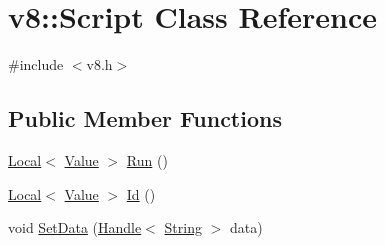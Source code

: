 \hypertarget{classv8_1_1_script}{}\section{v8\+:\+:Script Class Reference}
\label{classv8_1_1_script}


{\ttfamily \#include $<$v8.\+h$>$}

\subsection*{Public Member Functions}
\begin{DoxyCompactItemize}
\item 
\hyperlink{classv8_1_1_local}{Local}$<$ \hyperlink{classv8_1_1_value}{Value} $>$ \hyperlink{classv8_1_1_script_a5f43b29d40bd51ebad2cc275ba3898a1}{Run} ()
\item 
\hyperlink{classv8_1_1_local}{Local}$<$ \hyperlink{classv8_1_1_value}{Value} $>$ \hyperlink{classv8_1_1_script_aa25adfbb98af9179b4891e09432c2916}{Id} ()
\item 
void \hyperlink{classv8_1_1_script_a048fa4168b809ca73cc435e341e41b0b}{Set\+Data} (\hyperlink{classv8_1_1_handle}{Handle}$<$ \hyperlink{classv8_1_1_string}{String} $>$ data)
\end{DoxyCompactItemize}
